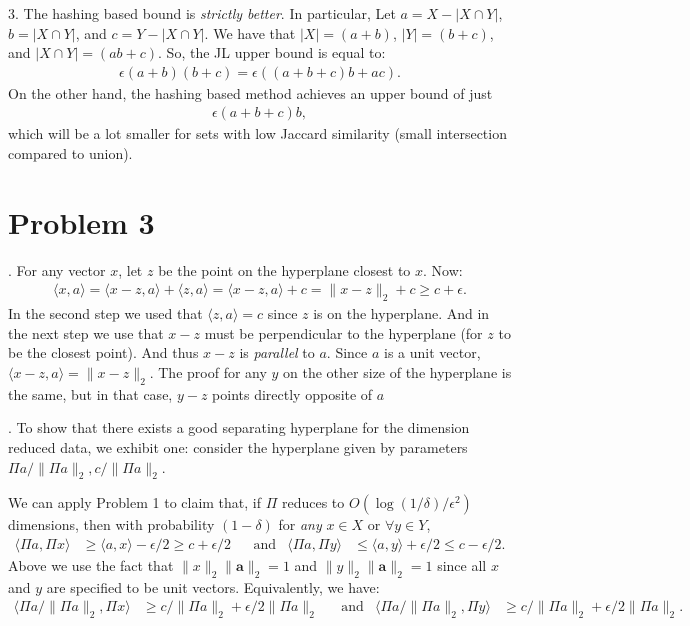 \documentclass[11pt]{article}
\newcommand{\bv}[1]{\mathbf{#1}}
\begin{document}
\vspace{.5em}
3. The hashing based bound is \emph{strictly better}. In particular, Let $a = X - |X\cap Y|$, $b = |X\cap Y|$, and $c = Y - |X\cap Y|$. We have that $|X| = (a+b)$, $|Y| = (b+c)$,  and $|X\cap Y|= (ab+c)$. So, the JL upper bound is equal to: 
\begin{align*}
	\epsilon (a+b)(b+c) = \epsilon\left((a+b+c)b + ac\right).
\end{align*}
On the other hand, the hashing based method achieves an upper bound of just 
\begin{align*}
	 \epsilon(a+b+c)b, 
\end{align*}
which will be a lot smaller for sets with low Jaccard similarity (small intersection compared to union). 

\section*{Problem 3}
	\smallskip{}.\hspace{1em}
	For any vector $x$, let $z$ be the point on the hyperplane closest to $x$. Now: 
	\begin{align*}
	\langle x, a \rangle = \langle x - z, a \rangle  + \langle z, a \rangle  = \langle x - z, a \rangle +c = \|x - z\|_2 + c \geq c + \epsilon.
	\end{align*}
In the second step we used that  $\langle z, a \rangle =c$ since $z$ is on the hyperplane. And in the next step we use that $x - z$ must be perpendicular to the hyperplane (for $z$ to be the closest point). And thus $x - z$ is \emph{parallel} to $a$. Since $a$ is a unit vector, $\langle x - z, a \rangle= \|x-z\|_2$. The proof for any $y$ on the other size of the hyperplane is the same, but in that case, $y-z$ points directly opposite of $a$
	
	\smallskip{}.\hspace{1em}	
	To show that there exists a good separating hyperplane for the dimension reduced data, we  exhibit one: consider the hyperplane given by parameters $\Pi a/\|\Pi a\|_2 , c/\|\Pi a\|_2$. 
	
	We can apply Problem 1 to claim that, if $\Pi$ reduces to $O(\log(1/\delta)/\epsilon^2)$ dimensions, then with probability $(1-\delta)$ for \emph{any} $x \in X$ or $\forall y \in Y$,
	\begin{align*}
	\langle \Pi a, \Pi x \rangle &\geq \langle a, x \rangle - \epsilon/2 \geq c + \epsilon/2 & &\text{and} & \langle \Pi a, \Pi y \rangle &\leq \langle a, y \rangle + \epsilon/2 \leq c - \epsilon/2.
	\end{align*}
	Above we use the fact that $\|x\|_2\|\bv{a}\|_2 = 1$ and $\|y\|_2\|\bv{a}\|_2 = 1$ since all $x$ and $y$ are specified to be unit vectors. Equivalently, we have:
	\begin{align}
	\label{eq:4}
	\langle \Pi a/\|\Pi a\|_2, \Pi x \rangle &\geq c/\|\Pi a\|_2 + \epsilon/2\|\Pi a\|_2 & &\text{and} & \langle \Pi a/\|\Pi a\|_2, \Pi y \rangle &\geq c/\|\Pi a\|_2 + \epsilon/2\|\Pi a\|_2.
	\end{align}
	
\end{document}
